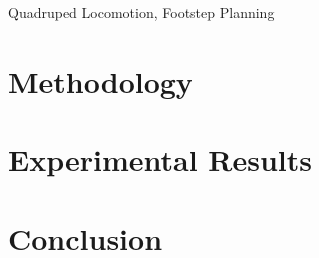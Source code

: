 \documentclass[conference]{IEEEtran}
\begin{document}
\begin{abstract}
  Quadruped locomotion in unstructured environments remains a
  significant challenge. This paper proposes a novel method for
  generating non-gaited, dynamic footstep plans using GaitNet, which
  evaluates and selects the most appropriate actions. By directly
  exploring the output space through projected gradient ascent,
  GaitNet optimizes spatial footstep coordinates over its own reward
  surface. We formulate the problem with 4 parallel tracks and 4
  steps of projected gradient ascent per foot. Our system is
  evaluated on a physical Unitree Go1 robot navigating complex
  terrain, demonstrating improvements over state-of-the-art model
  predictive control baselines.
\end{abstract}

\begin{IEEEkeywords}
Quadruped Locomotion, Footstep Planning
\end{IEEEkeywords}



\section{Methodology}
\label{sec:methodology}


\section{Experimental Results}
\label{sec:results}


\section{Conclusion}
\label{sec:conclusion}




\end{document}
